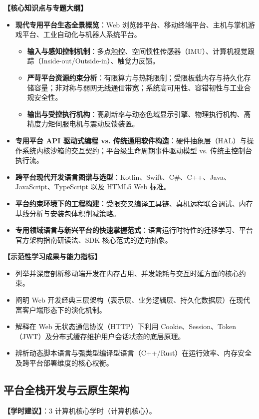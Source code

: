 \textbf{【核心知识点与专题大纲】}
\begin{itemize}
    \item \textbf{现代专用平台生态全景概览}：Web 浏览器平台、移动终端平台、主机与掌机游戏平台、工业自动化与机器人系统平台。
    \begin{itemize}
        \item \textbf{输入与感知控制机制}：多点触控、空间惯性传感器（IMU）、计算机视觉跟踪（Inside-out/Outside-in）、触觉力反馈。
        \item \textbf{严苛平台资源约束分析}：有限算力与热耗限制；受限板载内存与持久化存储容量；非对称与弱网无线通信带宽；系统高可用性、容错韧性与工业合规安全性。
        \item \textbf{输出与受控执行机构}：高刷新率与动态色域显示引擎、物理执行机构、高精度力矩伺服电机与震动反馈装置。
    \end{itemize}
    \item \textbf{专用平台 API 驱动式编程 vs. 传统通用软件构造}：硬件抽象层（HAL）与操作系统内核沙箱的交互契约；平台级生命周期事件驱动模型 vs. 传统主控制台执行流。
    \item \textbf{跨平台现代开发语言图谱与选型}：Kotlin、Swift、C\#、C++、Java、JavaScript、TypeScript 以及 HTML5 Web 标准。
    \item \textbf{平台约束环境下的工程构建}：受限交叉编译工具链、真机远程联合调试、内存基线分析与安装包体积削减策略。
    \item \textbf{专用领域语言与新兴平台的快速掌握范式}：语言运行时特性的迁移学习、平台官方架构指南研读法、SDK 核心范式的逆向抽象。
\end{itemize}

\textbf{【示范性学习成果与能力指标】}
\begin{itemize}
    \item 列举并深度剖析移动端开发在内存占用、并发能耗与交互时延方面的核心约束。
    \item 阐明 Web 开发经典三层架构（表示层、业务逻辑层、持久化数据层）在现代富客户端形态下的演化机制。
    \item 解释在 Web 无状态通信协议（HTTP）下利用 Cookie、Session、Token（JWT）及分布式缓存维护用户会话状态的底层原理。
    \item 辨析动态脚本语言与强类型编译型语言（C++/Rust）在运行效率、内存安全及跨平台部署维度的核心权衡。
\end{itemize}

\subsection{平台全栈开发与云原生架构}
\textbf{【学时建议】}：3 计算机核心学时（计算机核心）。


